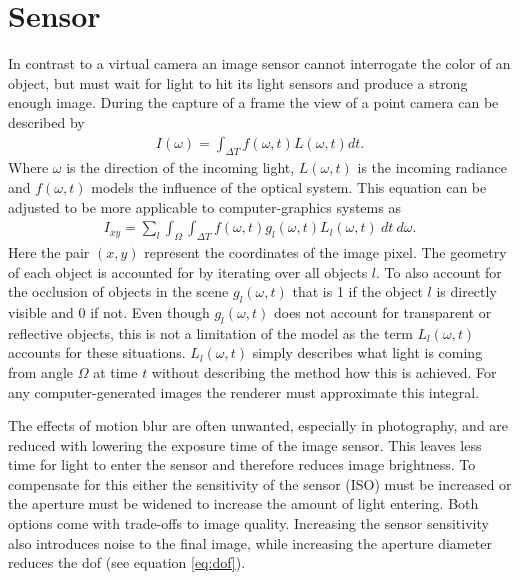 \section{Sensor}
In contrast to a virtual camera an image sensor cannot interrogate the color of an object, but must wait for light to hit its light sensors and produce a strong enough image.
During the capture of a frame the view of a point camera can be described by
\begin{align}
    I(\omega) = \int_{\Delta T} f(\omega,t) L(\omega,t)dt.
    \label{eq:mb-integral}
\end{align}
Where $\omega$ is the direction of the incoming light, $L(\omega,t)$ is the incoming radiance and $f(\omega,t)$ models the influence of the optical system.
This equation can be adjusted to be more applicable to computer-graphics systems as
\begin{align}
    I_{xy} = \sum_l \int_\Omega \int_{\Delta T} f(\omega, t) g_l(\omega, t) L_l(\omega, t) \: dt \: d\omega.
    \label{eq:mb-cg-integral}
\end{align}
Here the pair $(x,y)$ represent the coordinates of the image pixel.
The geometry of each object is accounted for by iterating over all objects $l$.
To also account for the occlusion of objects in the scene $g_l(\omega, t)$ that is 1 if the object $l$ is directly visible and 0 if not.
Even though $g_l(\omega, t)$ does not account for transparent or reflective objects, this is not a limitation of the model as the term $L_l(\omega, t)$ accounts for these situations.
$L_l(\omega, t)$ simply describes what light is coming from angle $\Omega$ at time $t$ without describing the method how this is achieved. \cite{Navarro.2011}
For any computer-generated images the renderer must approximate this integral.

The effects of motion blur are often unwanted, especially in photography, and are reduced with lowering the exposure time of the image sensor.
This leaves less time for light to enter the sensor and therefore reduces image brightness.
To compensate for this either the sensitivity of the sensor (ISO) must be increased or the aperture must be widened to increase the amount of light entering.
Both options come with trade-offs to image quality.
Increasing the sensor sensitivity also introduces noise to the final image, while increasing the aperture diameter reduces the \gls{dof} (see equation \ref{eq:dof}).

